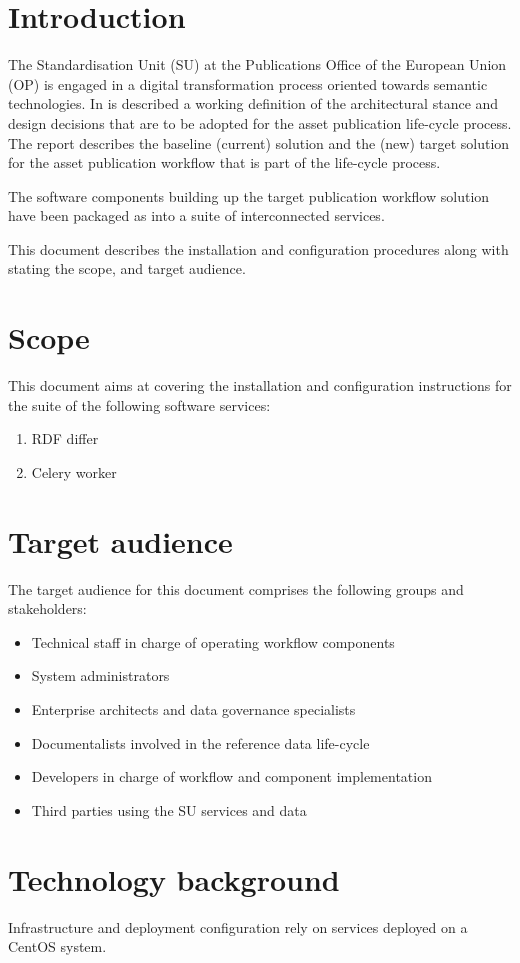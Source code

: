\section{Introduction}
\label{sec:introduction}

The Standardisation Unit (SU) at the Publications Office of the European Union (OP) is engaged in a digital transformation process oriented towards semantic technologies. In \citep{costetchi2020d} is described a working definition of the architectural stance and design decisions that are to be adopted for the asset publication life-cycle process. The report describes the baseline (current) solution and the (new) target solution for the asset publication workflow that is part of the life-cycle process. 

The software components building up the target publication workflow solution have been packaged as into a suite of interconnected services.

This document describes the installation and configuration procedures along with stating the scope, and target audience.

\section{Scope}
\label{sec:scope}

This document aims at covering the installation and configuration instructions for the suite of the following software services:

\begin{enumerate}
	\item RDF differ
	\item Celery worker
\end{enumerate}

\section{Target audience}
\label{sec:audience}

The target audience for this document comprises the following groups and stakeholders:	
\begin{itemize}
	\item Technical staff in charge of operating workflow components
	\item System administrators
	\item Enterprise architects and data governance specialists
	\item Documentalists involved in the reference data life-cycle
	\item Developers in charge of workflow and component implementation
	\item Third parties using the SU services and data
\end{itemize}

\section{Technology background}
\label{sec:background}

Infrastructure and deployment configuration rely on services deployed on a CentOS system.